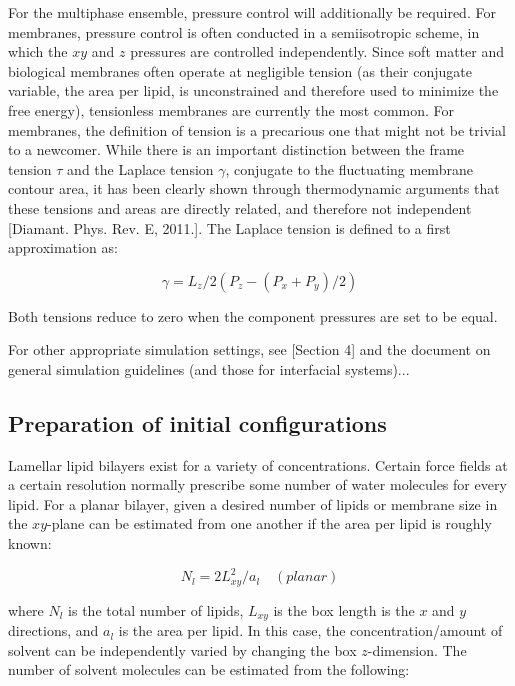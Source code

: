 \documentclass[9pt,bestpractices]{livecoms}
\begin{document}
For the multiphase ensemble, pressure control will additionally be required.
For membranes, pressure control is often conducted in a semiisotropic scheme, in which the $xy$ and $z$ pressures are controlled independently.
Since soft matter and biological membranes often operate at negligible tension (as their conjugate variable, the area per lipid, is unconstrained and therefore used to minimize the free energy), tensionless membranes are currently the most common.
For membranes, the definition of tension is a precarious one that might not be trivial to a newcomer.
While there is an important distinction between the frame tension $\tau$ and the Laplace tension $\gamma$, conjugate to the fluctuating membrane contour area, it has been clearly shown through thermodynamic arguments that these tensions and areas are directly related, and therefore not independent [Diamant. Phys. Rev. E, 2011.].
The Laplace tension is defined to a first approximation as:

\begin{equation}
	\label{e:partition}
	\gamma = L_z/2(P_z-(P_x+P_y)/2)
\end{equation}

Both tensions reduce to zero when the component pressures are set to be equal.

For other appropriate simulation settings, see [Section 4] and the document on general simulation guidelines (and those for interfacial systems)...

\subsection{Preparation of initial configurations}
Lamellar lipid bilayers exist for a variety of concentrations.
Certain force fields at a certain resolution normally prescribe some number of water molecules for every lipid.
For a planar bilayer, given a desired number of lipids or membrane size in the $xy$-plane can be estimated from one another if the area per lipid is roughly known:

\begin{equation}
	\label{e:partition}
	N_l = 2 L_{xy}^2/a_l \quad (planar)
\end{equation}

where $N_l$ is the total number of lipids, $L_{xy}$ is the box length is the $x$ and $y$ directions, and $a_l$ is the area per lipid. In this case, the concentration/amount of solvent can be independently varied by changing the box $z$-dimension. The number of solvent molecules can be estimated from the following:
\end{document}
